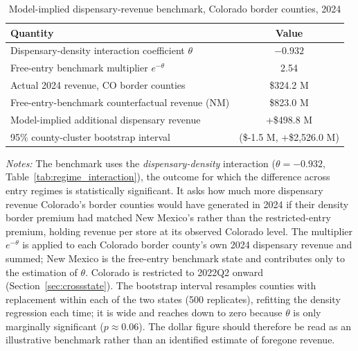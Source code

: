 \begin{table}[htbp]
\centering
\caption{Model-implied dispensary-revenue benchmark, Colorado border counties, 2024}
\label{tab:counterfactual}
\footnotesize
\begin{tabular}{lc}
\toprule
Quantity & Value \\
\midrule
Dispensary-density interaction coefficient $\theta$ & $-0.932$ \\
Free-entry benchmark multiplier $e^{-\theta}$ & 2.54 \\
\midrule
Actual 2024 revenue, CO border counties & \$324.2 M \\
Free-entry-benchmark counterfactual revenue (NM) & \$823.0 M \\
Model-implied additional dispensary revenue & +\$498.8 M \\
95\% county-cluster bootstrap interval & (\$-1.5 M, +\$2{,}526.0 M) \\
\bottomrule
\end{tabular}
\begin{minipage}{0.98\textwidth}
\vspace{0.5em}

\fontsize{9pt}{11pt}\selectfont
\textit{Notes:} The benchmark uses the \emph{dispensary-density} interaction
($\theta=-0.932$, Table~\ref{tab:regime_interaction}), the outcome for which the
difference across entry regimes is statistically significant. It asks how much
more dispensary revenue Colorado's border counties would have generated in 2024
if their density border premium had matched New Mexico's rather than the
restricted-entry premium, holding revenue per store at its observed Colorado
level. The multiplier $e^{-\theta}$ is applied to each Colorado border county's
own 2024 dispensary revenue and summed; New Mexico is the free-entry benchmark
state and contributes only to the estimation of $\theta$. Colorado is restricted
to 2022Q2 onward (Section~\ref{sec:crossstate}). The bootstrap interval resamples
counties with replacement within each of the two states (500 replicates),
refitting the density regression each time; it is wide and reaches down to zero
because $\theta$ is only marginally significant ($p\approx0.06$). The dollar
figure should therefore be read as an illustrative benchmark rather than an
identified estimate of foregone revenue.
\end{minipage}
\end{table}
